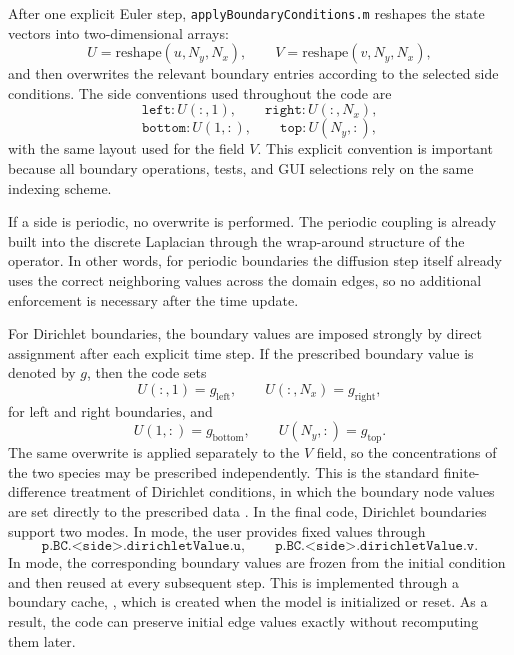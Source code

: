 After one explicit Euler step, \texttt{applyBoundaryConditions.m} reshapes the state vectors into two-dimensional arrays:
\[
U = \mathrm{reshape}(u,N_y,N_x),
\qquad
V = \mathrm{reshape}(v,N_y,N_x),
\]
and then overwrites the relevant boundary entries according to the selected side conditions. The side conventions used throughout the code are
\[
\texttt{left}: U(:,1), \qquad
\texttt{right}: U(:,N_x),
\]
\[
\texttt{bottom}: U(1,:), \qquad
\texttt{top}: U(N_y,:),
\]
with the same layout used for the field $V$. This explicit convention is important because all boundary operations, tests, and GUI selections rely on the same indexing scheme.

If a side is periodic, no overwrite is performed. The periodic coupling is already built into the discrete Laplacian through the wrap-around structure of the operator. In other words, for periodic boundaries the diffusion step itself already uses the correct neighboring values across the domain edges, so no additional enforcement is necessary after the time update.

For Dirichlet boundaries, the boundary values are imposed strongly by direct assignment after each explicit time step. If the prescribed boundary value is denoted by $g$, then the code sets
\begin{equation}
U(:,1) = g_{\mathrm{left}},
\qquad
U(:,N_x) = g_{\mathrm{right}},
\label{eq:dirichlet_lr_numimpl}
\end{equation}
for left and right boundaries, and
\begin{equation}
U(1,:) = g_{\mathrm{bottom}},
\qquad
U(N_y,:) = g_{\mathrm{top}}.
\label{eq:dirichlet_bt_numimpl}
\end{equation}
The same overwrite is applied separately to the $V$ field, so the concentrations of the two species may be prescribed independently. This is the standard finite-difference treatment of Dirichlet conditions, in which the boundary node values are set directly to the prescribed data \cite{leveque2007}. In the final code, Dirichlet boundaries support two modes. In  mode, the user provides fixed values through
\[
\texttt{p.BC.<side>.dirichletValue.u},
\qquad
\texttt{p.BC.<side>.dirichletValue.v}.
\]
In  mode, the corresponding boundary values are frozen from the initial condition and then reused at every subsequent step. This is implemented through a boundary cache, , which is created when the model is initialized or reset. As a result, the code can preserve initial edge values exactly without recomputing them later.


